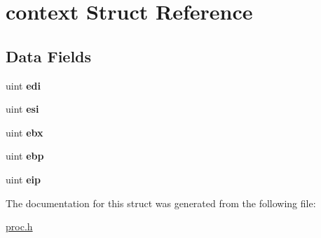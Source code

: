 \hypertarget{structcontext}{}\section{context Struct Reference}
\label{structcontext}
\subsection*{Data Fields}
\begin{DoxyCompactItemize}
\item 
\mbox{\label{structcontext_a9c926d583d00a615327b9b4a8fe0ab63}} 
uint {\bfseries edi}
\item 
\mbox{\label{structcontext_a9596ea769c8681490bbc67fd1b0abc92}} 
uint {\bfseries esi}
\item 
\mbox{\label{structcontext_ab1dd54ca1266e38df5943750224cd8d5}} 
uint {\bfseries ebx}
\item 
\mbox{\label{structcontext_ac9640ddc2e90e4213ba9847bbe1b0e57}} 
uint {\bfseries ebp}
\item 
\mbox{\label{structcontext_a0cfb49e5b03fd7bf12fa79d1a42be935}} 
uint {\bfseries eip}
\end{DoxyCompactItemize}


The documentation for this struct was generated from the following file\+:\begin{DoxyCompactItemize}
\item 
\mbox{\hyperlink{proc_8h}{proc.\+h}}\end{DoxyCompactItemize}
